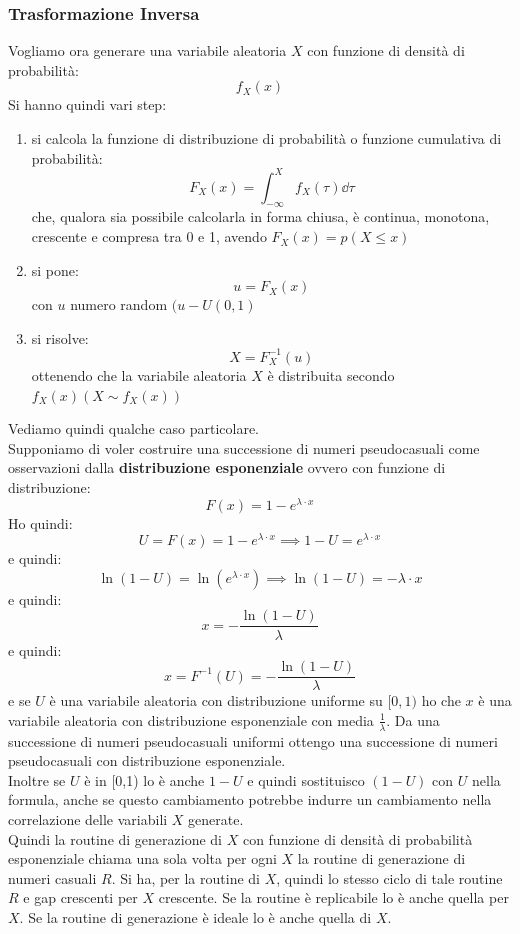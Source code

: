 \message{ !name(modprob.tex)}\documentclass[a4paper,12pt, oneside]{book}
\begin{document}
\subsubsection{Trasformazione Inversa}
Vogliamo ora generare una variabile aleatoria $X$ con funzione di densità di
probabilità:
\[f_X(x)\]
Si hanno quindi vari step:
\begin{enumerate}
  \item si calcola la funzione di distribuzione di probabilità o funzione
  cumulativa di probabilità:
  \[F_X(x)=\int_{-\infty}^Xf_X(\tau)\dd{\tau}\]
  che, qualora sia possibile calcolarla in forma chiusa, è continua, monotona,
  crescente e compresa tra 0 e 1, avendo $F_X(x)=p(X\leq x)$
  \item si pone:
  \[u=F_X(x)\]
  con $u$ numero random $(u-U(0,1)$
  \item si risolve:
  \[X=F_X^{-1}(u)\]
  ottenendo che la variabile aleatoria $X$ è distribuita secondo $f_X(x)(X\sim
  f_X(x))$ 
\end{enumerate}
Vediamo quindi qualche caso particolare.\\
Supponiamo di voler costruire una successione di numeri pseudocasuali come
osservazioni dalla \textbf{distribuzione esponenziale} ovvero con funzione di
distribuzione:
\[F(x)=1-e^{\lambda\cdot x}\]
Ho quindi:
\[U=F(x)=1-e^{\lambda\cdot x}\implies 1-U=e^{\lambda\cdot x}\]
e quindi:
\[\ln(1-U)=\ln(e^{\lambda\cdot x})\implies \ln(1-U)=-\lambda\cdot x\]
e quindi:
\[x=-\frac{\ln(1-U)}{\lambda}\]
e quindi:
\[x=F^{-1}(U)=-\frac{\ln(1-U)}{\lambda}\]
e se $U$ è una variabile aleatoria con distribuzione uniforme su $[0,1)$ ho che
$x$ è una variabile aleatoria con distribuzione esponenziale con media
$\frac{1}{\lambda}$. Da una successione di numeri pseudocasuali uniformi ottengo
una successione di numeri pseudocasuali con distribuzione esponenziale. \\
Inoltre se $U$ è in [0,1) lo è anche $1-U$ e quindi sostituisco $(1-U)$ con $U$
nella formula, anche se questo cambiamento potrebbe indurre un cambiamento nella
correlazione delle variabili $X$ generate. \\
Quindi la routine di generazione di $X$ con funzione di densità di probabilità
esponenziale chiama una sola volta per ogni $X$ la routine di generazione di
numeri casuali $R$. Si ha, per la routine di $X$, quindi lo stesso ciclo di tale
routine $R$ e gap crescenti per 
$X$ crescente. Se la routine è replicabile lo è anche quella per $X$. Se la
routine di generazione è ideale lo è anche quella di $X$.\\
\end{document}
